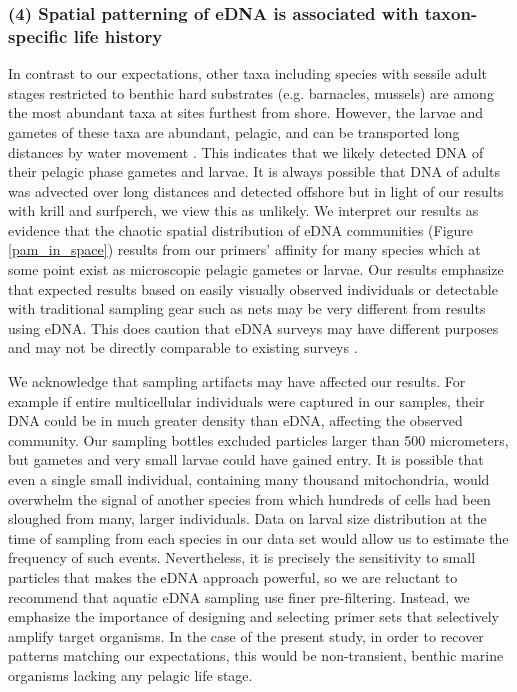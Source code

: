 \documentclass[11pt,letterpaper]{article} %
\begin{document}
\subsubsection*{(4) Spatial patterning of eDNA is associated with taxon-specific life history}
In contrast to our expectations, other taxa including species with sessile adult stages restricted to benthic hard substrates (e.g. barnacles, mussels) are among the most abundant taxa at sites furthest from shore. However, the larvae and gametes of these taxa are abundant, pelagic, and can be transported long distances by water movement \citep{Strathmann1987}. This indicates that we likely detected DNA of their pelagic phase gametes and larvae. It is always possible that DNA of adults was advected over long distances and detected offshore but in light of our results with krill and surfperch, we view this as unlikely. We interpret our results as evidence that the chaotic spatial distribution of eDNA communities (Figure \ref{pam_in_space}) results from our primers' affinity for many species which at some point exist as microscopic pelagic gametes or larvae. Our results emphasize that expected results based on easily visually observed individuals or detectable with traditional sampling gear such as nets may be very different from results using eDNA. This does caution that eDNA surveys may have different purposes and may not be directly comparable to existing surveys \citep{Shelton2016}.


We acknowledge that sampling artifacts may have affected our results. For example if entire multicellular individuals were captured in our samples, their DNA could be in much greater density than eDNA, affecting the observed community. Our sampling bottles excluded particles larger than 500 micrometers, but gametes and very small larvae could have gained entry. It is possible that even a single small individual, containing many thousand mitochondria, would overwhelm the signal of another species from which hundreds of cells had been sloughed from many, larger individuals. Data on larval size distribution at the time of sampling from each species in our data set would allow us to estimate the frequency of such events. Nevertheless, it is precisely the sensitivity to small particles that makes the eDNA approach powerful, so we are reluctant to recommend that aquatic eDNA sampling use finer pre-filtering. Instead, we emphasize the importance of designing and selecting primer sets that selectively amplify target organisms. In the case of the present study, in order to recover patterns matching our expectations, this would be non-transient, benthic marine organisms lacking any pelagic life stage.
\end{document}
